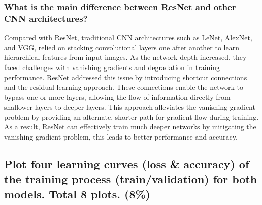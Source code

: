 \documentclass[a4paper, 12pt]{article}
\begin{document}
\subsubsection{What is the main difference between ResNet and other CNN architectures?}
Compared with ResNet, traditional CNN architectures such as LeNet, AlexNet, and VGG, relied on stacking convolutional layers one after another to learn hierarchical features from input images. As the network depth increased, they faced challenges with vanishing gradients and degradation in training performance. ResNet addressed this issue by introducing shortcut connections and the residual learning approach. These connections enable the network to bypass one or more layers, allowing the flow of information directly from shallower layers to deeper layers. This approach alleviates the vanishing gradient problem by providing an alternate, shorter path for gradient flow during training. As a result, ResNet can effectively train much deeper networks by mitigating the vanishing gradient problem, this leads to better performance and accuracy.

\subsection{Plot four learning curves (loss \& accuracy) of the training process (train/validation) for both models. Total 8 plots. (8\%)}
\end{document}
